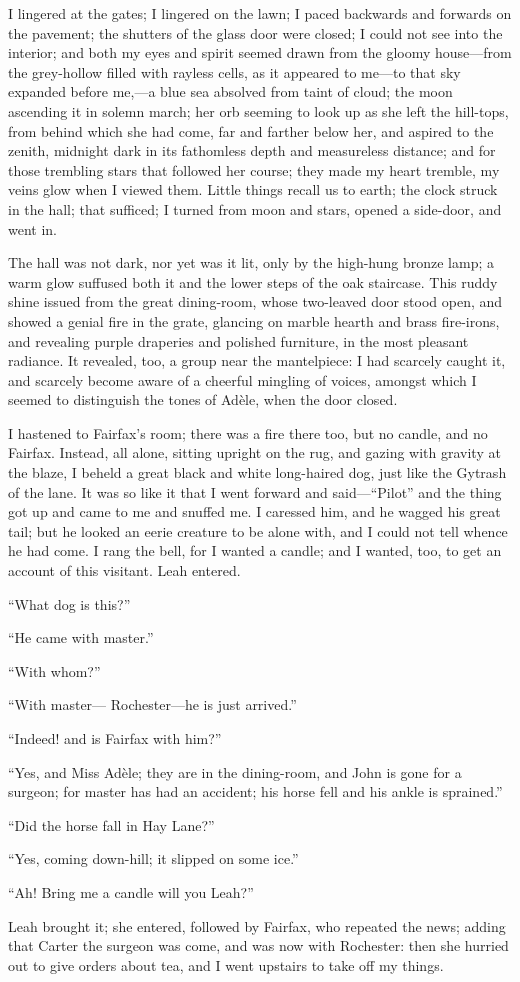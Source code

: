 I lingered at the gates; I lingered on the lawn; I paced backwards and
forwards on the pavement; the shutters of the glass door were closed; I
could not see into the interior; and both my eyes and spirit seemed
drawn from the gloomy house---from the grey-hollow filled with rayless
cells, as it appeared to me---to that sky expanded before me,---a blue
sea absolved from taint of cloud; the moon ascending it in solemn march;
her orb seeming to look up as she left the hill-tops, from behind which
she had come, far and farther below her, and aspired to the zenith,
midnight dark in its fathomless depth and measureless distance; and for
those trembling stars that followed her course; they made my heart
tremble, my veins glow when I viewed them. Little things recall us to
earth; the clock struck in the hall; that sufficed; I turned from moon
and stars, opened a side-door, and went in.

The hall was not dark, nor yet was it lit, only by the high-hung bronze
lamp; a warm glow suffused both it and the lower steps of the oak
staircase. This ruddy shine issued from the great dining-room, whose
two-leaved door stood open, and showed a genial fire in the grate,
glancing on marble hearth and brass fire-irons, and revealing purple
draperies and polished furniture, in the most pleasant radiance. It
revealed, too, a group near the mantelpiece: I had scarcely caught it,
and scarcely become aware of a cheerful mingling of voices, amongst
which I seemed to distinguish the tones of Adèle, when the door closed.

I hastened to \Mrs{} Fairfax's room; there was a fire there too, but no
candle, and no \Mrs{} Fairfax. Instead, all alone, sitting upright on the
rug, and gazing with gravity at the blaze, I beheld a great black and
white long-haired dog, just like the Gytrash of the lane. It was so
like it that I went forward and said---\enquote{Pilot} and the thing got
up and came to me and snuffed me. I caressed him, and he wagged his
great tail; but he looked an eerie creature to be alone with, and I
could not tell whence he had come. I rang the bell, for I wanted a
candle; and I wanted, too, to get an account of this visitant. Leah
entered.

\enquote{What dog is this?}

\enquote{He came with master.}

\enquote{With whom?}

\enquote{With master---\Mr{} Rochester---he is just arrived.}

\enquote{Indeed! and is \Mrs{} Fairfax with him?}

\enquote{Yes, and Miss Adèle; they are in the dining-room, and John is
gone for a surgeon; for master has had an accident; his horse fell and
his ankle is sprained.}

\enquote{Did the horse fall in Hay Lane?}

\enquote{Yes, coming down-hill; it slipped on some ice.}

\enquote{Ah! Bring me a candle will you Leah?}

Leah brought it; she entered, followed by \Mrs{} Fairfax, who repeated the
news; adding that \Mr{} Carter the surgeon was come, and was now with \Mr{}
 Rochester: then she hurried out to give orders about tea, and I went
upstairs to take off my things.
